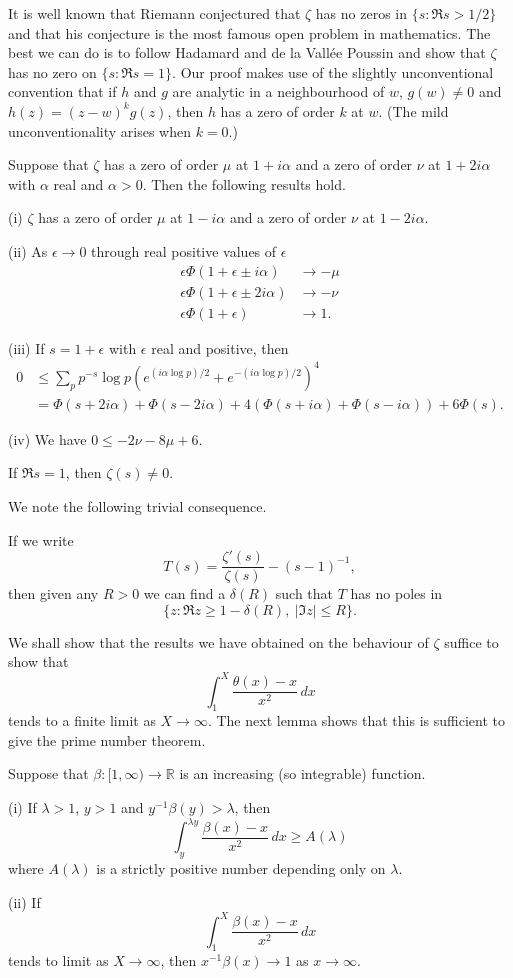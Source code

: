 It is well known that Riemann conjectured that $\zeta$
has no zeros in $\{s:\Re s>1/2\}$ and that his conjecture
is the most famous open problem in mathematics.
The best we can do is to follow Hadamard and
de la Vall\'{e}e Poussin and show that $\zeta$
has no zero on $\{s:\Re s=1\}$. Our proof makes
use of the slightly unconventional convention
that if $h$ and $g$ are analytic in a neighbourhood of $w$,
$g(w)\neq 0$
and $h(z)=(z-w)^{k}g(z)$, then $h$ has a zero
of order $k$ at $w$. (The mild unconventionality arises
when $k=0$.)
\begin{lemma} Suppose that $\zeta$ has a zero of order
$\mu$ at $1+i\alpha$
and a zero of order $\nu$ at $1+2i\alpha$
with $\alpha$ real and $\alpha>0$. Then
the following results hold.

(i) $\zeta$ has a zero of order $\mu$ at $1-i\alpha$
and a zero of order $\nu$ at $1-2i\alpha$.

(ii) As $\epsilon\rightarrow 0$ through
real positive values of $\epsilon$
\begin{align*}
\epsilon\Phi(1+\epsilon \pm i\alpha)&\rightarrow -\mu\\
\epsilon\Phi(1+\epsilon \pm 2i\alpha)&\rightarrow -\nu\\
\epsilon\Phi(1+\epsilon)&\rightarrow 1.
\end{align*}

(iii) If $s=1+\epsilon$ with $\epsilon$ real and positive,
then
\begin{align*}
0&\leq\sum_{p}p^{-s}\log p (e^{(i\alpha\log p)/2}+
e^{-(i\alpha\log p)/2})^{4}\\
&=\Phi(s+2i\alpha)+\Phi(s-2i\alpha)
+4(\Phi(s+i\alpha)+\Phi(s-i\alpha))
+6\Phi(s).
\end{align*}

(iv) We have $0\leq-2\nu-8\mu+6$.
\end{lemma}
\begin{theorem} If $\Re s=1$, then $\zeta(s)\neq 0$.
\end{theorem}
We note the following trivial consequence.
\begin{lemma}
If we write
\[T(s)=\frac{\zeta'(s)}{\zeta(s)}-(s-1)^{-1},\]
then given any $R>0$ we can find a $\delta(R)$
such that $T$ has no poles in
\[\{z:\Re z\geq 1-\delta(R),\ |\Im z|\leq R\}.\]
\end{lemma}

We shall show that the results we have obtained on
the behaviour of $\zeta$ suffice to show that
\[\int_{1}^{X}\frac{\theta(x)-x}{x^{2}}\,dx\]
tends to a finite limit as $X\rightarrow\infty$.
The next lemma shows that this is sufficient to
give the prime number theorem.
\begin{lemma} Suppose that
$\beta:[1,\infty)\rightarrow{\mathbb R}$
is an increasing (so integrable) function.

(i) If $\lambda>1$, $y>1$ and $y^{-1}\beta(y)>\lambda$,
then
\[\int_{y}^{\lambda y}\frac{\beta(x)-x}{x^{2}}\,dx
\geq A(\lambda)\]
where $A(\lambda)$ is a strictly positive number
depending only on $\lambda$.

(ii) If
\[\int_{1}^{X}\frac{\beta(x)-x}{x^{2}}\,dx\]
tends to limit as $X\rightarrow\infty$, then
$x^{-1}\beta(x)\rightarrow 1$ as $x\rightarrow\infty$.
\end{lemma}

